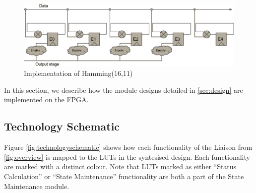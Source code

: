 
\begin{figure}
\includegraphics[width=15cm]{implementation/fig_ecc}
\caption{Implementation of Hamming(16,11)}
\label{fig:ecc}
\end{figure}

In this section, we describe how the module designs detailed in
\autoref{sec:design} are implemented on the FPGA. 

\subsection{Technology Schematic}
\label{sec:technologyschematic}

Figure \autoref{fig:technologyschematic} shows how each functionality of
the Liaison from \autoref{fig:overview} is mapped to the LUTs in the syntesised design.
Each functionality are marked with a distinct colour. Note that LUTs marked as either
``Status Calculation'' or ``State Maintenance'' functionality are both a part of the
State Maintenance module.


